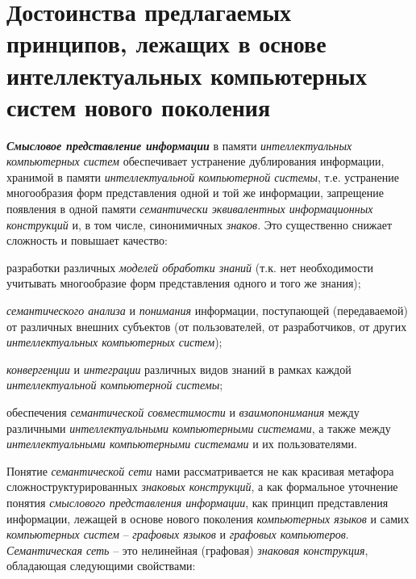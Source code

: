 \section{Достоинства предлагаемых принципов, лежащих в основе интеллектуальных компьютерных систем нового поколения}

\textbf{\textit{Смысловое представление информации}} в памяти \textit{интеллектуальных компьютерных систем} обеспечивает устранение дублирования информации, хранимой в памяти \textit{интеллектуальной компьютерной системы}, т.е. устранение многообразия форм представления одной и той же информации, запрещение появления в одной памяти \textit{семантически эквивалентных информационных конструкций} и, в том числе, синонимичных \textit{знаков}. Это существенно снижает сложность и повышает качество:

\begin{textitemize}
	\item
	разработки различных \textit{моделей обработки знаний} (т.к. нет необходимости учитывать многообразие форм представления одного и того же знания);
	\item
	\textit{семантического анализа} и \textit{понимания} информации, поступающей (передаваемой) от различных внешних субъектов (от пользователей, от разработчиков, от других \textit{интеллектуальных компьютерных систем});
	\item
	\textit{конвергенции} и \textit{интеграции} различных видов знаний в рамках каждой \textit{интеллектуальной компьютерной системы};
	\item
	обеспечения \textit{семантической совместимости} и \textit{взаимопонимания} между различными \textit{интеллектуальными компьютерными системами}, а также между \textit{интеллектуальными компьютерными системами} и их пользователями.
\end{textitemize}

Понятие \textit{семантической сети} нами рассматривается не как красивая метафора сложноструктурированных \textit{знаковых конструкций}, а как формальное уточнение понятия \textit{смыслового представления информации}, как принцип представления информации, лежащей в основе нового поколения \textit{компьютерных языков} и самих \textit{компьютерных систем} -- \textit{графовых языков} и \textit{графовых компьютеров}. \textit{Семантическая сеть} -- это нелинейная (графовая) \textit{знаковая конструкция}, обладающая следующими свойствами:

